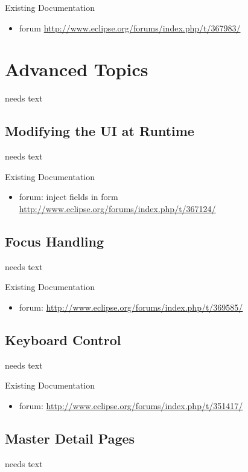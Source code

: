 \documentclass[a4paper,10pt,twoside]{book}
\begin{document}
\noindent Existing Documentation
\begin{itemize}
  \item forum \url{http://www.eclipse.org/forums/index.php/t/367983/}
\end{itemize}

\chapter{Advanced Topics}
needs text  

\section{Modifying the UI at Runtime}
needs text

\noindent Existing Documentation
\begin{itemize}
  \item forum: inject fields in form \url{http://www.eclipse.org/forums/index.php/t/367124/}
\end{itemize}

\section{Focus Handling}
needs text

\noindent Existing Documentation
\begin{itemize}
  \item forum: \url{http://www.eclipse.org/forums/index.php/t/369585/}
\end{itemize}

\section{Keyboard Control}
needs text

\noindent Existing Documentation
\begin{itemize}
  \item forum: \url{http://www.eclipse.org/forums/index.php/t/351417/}
\end{itemize}

\section{Master Detail Pages}
needs text
\end{document}
